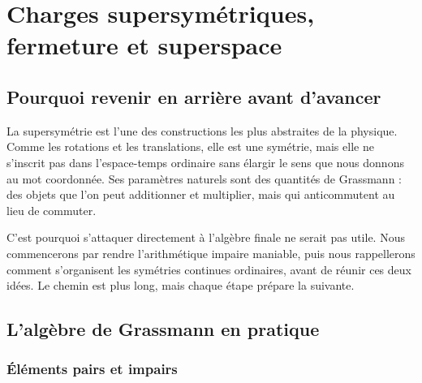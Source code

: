 \chapter{Charges supersymétriques, fermeture et superspace}


\section{Pourquoi revenir en arrière avant d’avancer}

La supersymétrie est l’une des constructions les plus abstraites de la physique. Comme les rotations et les translations, elle est une symétrie, mais elle ne s’inscrit pas dans l’espace-temps ordinaire sans élargir le sens que nous donnons au mot coordonnée. Ses paramètres naturels sont des quantités de Grassmann : des objets que l’on peut additionner et multiplier, mais qui anticommutent au lieu de commuter.

C’est pourquoi s’attaquer directement à l’algèbre finale ne serait pas utile. Nous commencerons par rendre l’arithmétique impaire maniable, puis nous rappellerons comment s’organisent les symétries continues ordinaires, avant de réunir ces deux idées. Le chemin est plus long, mais chaque étape prépare la suivante.

\section{L’algèbre de Grassmann en pratique}

\subsection{Éléments pairs et impairs}

